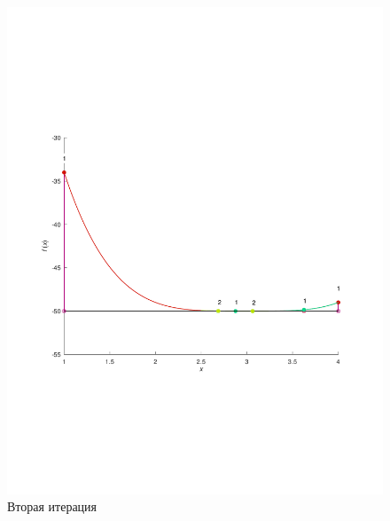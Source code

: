 \documentclass[a4paper,12pt]{article}
\begin{document}
    \begin{figure}[H]
        \centering
        \includegraphics[scale=0.4]{2Bolcanoitter.pdf}
        \caption{Вторая итерация}
    \end{figure}
\end{document}
